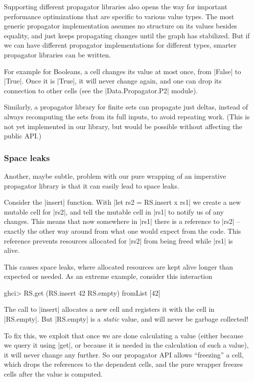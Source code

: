 \documentclass[manuscript,screen,acmsmall,nonacm]{acmart}
\begin{document}
Supporting different propagator libraries also opens the way for important performance optimizations that are specific to various value types. The most generic propagator implementation assumes no structure on its values besides equality, and just keeps propagating changes until the graph has stabilized. But if we can have different propagator implementations for different types, smarter propagator libraries can be written.

For example for Booleans, a cell changes its value at most once, from |False| to |True|. Once it is |True|, it will never change again, and one can drop its connection to other cells (see the |Data.Propagator.P2| module).

Similarly, a propagator library for finite sets can propagate just deltas, instead of always recomputing the sets from its full inputs, to avoid repeating work. (This is not yet implemented in our library, but would be possible without affecting the public API.)

\subsubsection{Space leaks}\label{sec:spaceleak}

Another, maybe subtle, problem with our pure wrapping of an imperative propagator library is that it can easily lead to space leaks.

Consider the |insert| function. With |let rs2 = RS.insert x rs1| we create a new mutable cell for |rs2|, and tell the mutable cell in |rs1| to notify us of any changes. This means that now somewhere in |rs1| there is a reference to |rs2| -- exactly the other way around from what one would expect from the code. This reference prevents resources allocated for |rs2| from being freed while |rs1| is alive.

This causes space leaks, where allocated resources are kept alive longer than expected or needed. As an extreme example, consider this interaction
\begin{code}
ghci> RS.get (RS.insert 42 RS.empty)
fromList [42]
\end{code}
The call to |insert| allocates a new cell and registers it with the cell in |RS.empty|. But |RS.empty| is a \emph{static} value, and will never be garbage collected!

To fix this, we exploit that once we are done calculating a value (either because we query it using |get|, or because it is needed in the calculation of such a value), it will never change any further. So our propagator API allows “freezing” a cell, which drops the references to the dependent cells, and the pure wrapper freezes cells after the value is computed.
\end{document}
